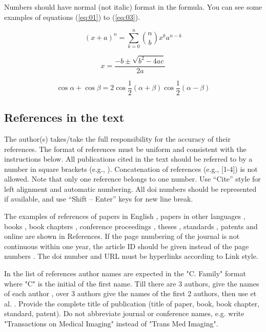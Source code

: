 \documentclass[10pt,a4paper,twocolumns]{article}
\begin{document}
Numbers should have normal (not italic) format in the formula. You can see some examples of equations (\ref{eq:01}) to (\ref{eq:03}).

\begin{equation}\label{eq:01}
  (x+a)^n=\sum_{k=0}^{n} \binom{n}{b} x^{k} a^{n-k}
\end{equation}

\begin{equation}\label{eq:02}
  x=\frac{-b\pm\sqrt{b^2-4ac}}{2a}
\end{equation}

\begin{equation}\label{eq:03}
  \cos \alpha + \cos \beta = 2 \cos \frac{1}{2}(\alpha + \beta) \cos \frac{1}{2}(\alpha - \beta)
\end{equation}

\subsection{References in the text}

The author(s) takes/take the full responsibility for the accuracy of their references. The format of references must be uniform and consistent with the instructions below. All publications cited in the text should be referred to by a number in square brackets (e.g., \cite{article_a}). Concatenation of references (e.g., [1-4]) is not allowed. Note that only one reference belongs to one number. Use “Cite” style for left alignment and automatic numbering. All doi numbers should be represented if available, and use “Shift – Enter” keys for new line break.

The examples of references of papers in English \cite{article_a}, papers in other languages \cite{article_b}, books \cite{book}, book chapters \cite{incollection}, conference proceedings \cite{conference}, theses \cite{phdthesis}, standards \cite{standard}, patents \cite{patent} and online \cite{online} are shown in References. If the page numbering of the journal is not continuous within one year, the article ID should be given instead of the page numbers \cite{article_c}. The doi number and URL must be hyperlinks \cite{article_a} \cite{book} \cite{conference} according to Link style.

In the list of references author names are expected in the "C. Family" format where "C" is the initial of the first name. Till there are 3 authors, give the names of each author \cite{article_b}, over 3 authors give the names of the first 2 authors, then use et al. \cite{article_d}. Provide the complete title of publication (title of paper, book, book chapter, standard, patent). Do not abbreviate journal or conference names, e.g. write "Transactions on Medical Imaging" instead of "Trans Med Imaging".
\end{document}

